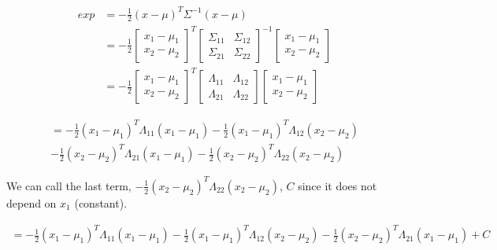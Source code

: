 \documentclass{article}
\begin{document}
\begin{enumerate}[label=(\alph*)]

\begin{align*}
exp&=-\frac{1}{2}(x-\mu)^T\Sigma^{-1}(x-\mu) \\
&=-\frac{1}{2}
\begin{bmatrix}
  x_1 - \mu_1 \\ x_2 - \mu_2
\end{bmatrix}
^T
\begin{bmatrix}
  \Sigma_{11} & \Sigma_{12} \\ \Sigma_{21} & \Sigma_{22}
\end{bmatrix}
^{-1}
\begin{bmatrix}
  x_1 - \mu_1 \\ x_2 - \mu_2
\end{bmatrix} \\
&=-\frac{1}{2}
\begin{bmatrix}
  x_1 - \mu_1 \\ x_2 - \mu_2
\end{bmatrix}
^T
\begin{bmatrix}
  \Lambda_{11} & \Lambda_{12} \\ \Lambda_{21} & \Lambda_{22}
\end{bmatrix}
\begin{bmatrix}
  x_1 - \mu_1 \\ x_2 - \mu_2
\end{bmatrix}
\end{align*}

\begin{multline*}
=-\frac{1}{2}(x_1-\mu_1)^T\Lambda_{11}(x_1-\mu_1)
-\frac{1}{2}(x_1-\mu_1)^T\Lambda_{12}(x_2-\mu_2) \\
-\frac{1}{2}(x_2-\mu_2)^T\Lambda_{21}(x_1-\mu_1) 
-\frac{1}{2}(x_2-\mu_2)^T\Lambda_{22}(x_2-\mu_2)
\end{multline*}

We can call the last term, $-\frac{1}{2}(x_2-\mu_2)^T\Lambda_{22}(x_2-\mu_2)$, $C$ since it does not depend on $x_1$ (constant).

\begin{multline*}
=-\frac{1}{2}(x_1-\mu_1)^T\Lambda_{11}(x_1-\mu_1)
-\frac{1}{2}(x_1-\mu_1)^T\Lambda_{12}(x_2-\mu_2)
-\frac{1}{2}(x_2-\mu_2)^T\Lambda_{21}(x_1-\mu_1) 
+C
\end{multline*}


\end{enumerate}
\end{document}
